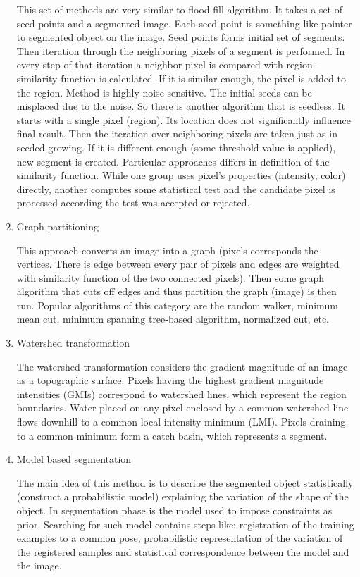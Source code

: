\begin{enumerate}
  This set of methods are very similar to flood-fill algorithm.
It takes a set of seed points and a segmented image.
Each seed point is something like pointer to segmented object on the image.
Seed points forms initial set of segments.
Then iteration through the neighboring pixels of a segment is performed.
In every step of that iteration a neighbor pixel is compared with region - similarity function is calculated.
If it is similar enough, the pixel is added to the region.
  Method is highly noise-sensitive.
The initial seeds can be misplaced due to the noise.
So there is another algorithm that is seedless.
It starts with a single pixel (region).
Its location does not significantly influence final result.
Then the iteration over neighboring pixels are taken just as in seeded growing.
If it is different enough (some threshold value is applied), new segment is created.
  Particular approaches differs in definition of the similarity function.
While one group uses pixel's properties (intensity, color) directly, another computes some statistical test and the candidate pixel is processed according the test was accepted or rejected.

  \item Graph partitioning

  This approach converts an image into a graph (pixels corresponds the vertices.
There is edge between every pair of pixels and edges are weighted with similarity function of the two connected pixels).
Then some graph algorithm that cuts off edges and thus partition the graph (image) is then run.
Popular algorithms of this category are the random walker, minimum mean cut, minimum spanning tree-based algorithm, normalized cut, etc.

  \item Watershed transformation

  The watershed transformation considers the gradient magnitude of an image as a topographic surface.
Pixels having the highest gradient magnitude intensities (GMIs) correspond to watershed lines, which represent the region boundaries.
Water placed on any pixel enclosed by a common watershed line flows downhill to a common local intensity minimum (LMI).
Pixels draining to a common minimum form a catch basin, which represents a segment.

  \item Model based segmentation

  The main idea of this method is to describe the segmented object statistically (construct a probabilistic model) explaining the variation of the shape of the object.
In segmentation phase is the model used to impose constraints as prior.
Searching for such model contains steps like: registration of the training examples to a common pose, probabilistic representation of the variation of the registered samples and statistical correspondence between the model and the image.


\end{enumerate}
